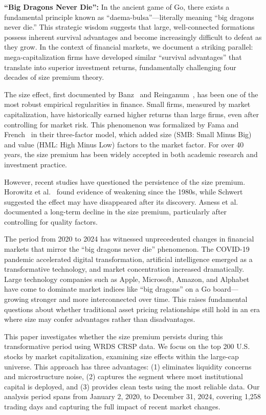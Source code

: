 \documentclass[10pt,letterpaper]{article}
\begin{document}
\textbf{``Big Dragons Never Die'':} In the ancient game of Go, there exists a fundamental principle known as ``daema-bulsa''---literally meaning ``big dragons never die.'' This strategic wisdom suggests that large, well-connected formations possess inherent survival advantages and become increasingly difficult to defeat as they grow. In the context of financial markets, we document a striking parallel: mega-capitalization firms have developed similar ``survival advantages'' that translate into superior investment returns, fundamentally challenging four decades of size premium theory.

The size effect, first documented by Banz~\cite{banz1981} and Reinganum~\cite{reinganum1981}, has been one of the most robust empirical regularities in finance. Small firms, measured by market capitalization, have historically earned higher returns than large firms, even after controlling for market risk. This phenomenon was formalized by Fama and French~\cite{fama1993} in their three-factor model, which added size (SMB: Small Minus Big) and value (HML: High Minus Low) factors to the market factor. For over 40 years, the size premium has been widely accepted in both academic research and investment practice.

However, recent studies have questioned the persistence of the size premium. Horowitz et al.~\cite{horowitz2000} found evidence of weakening since the 1980s, while Schwert~\cite{schwert2003} suggested the effect may have disappeared after its discovery. Asness et al.~\cite{asness2018} documented a long-term decline in the size premium, particularly after controlling for quality factors.

The period from 2020 to 2024 has witnessed unprecedented changes in financial markets that mirror the ``big dragons never die'' phenomenon. The COVID-19 pandemic accelerated digital transformation, artificial intelligence emerged as a transformative technology, and market concentration increased dramatically. Large technology companies such as Apple, Microsoft, Amazon, and Alphabet have come to dominate market indices like ``big dragons'' on a Go board---growing stronger and more interconnected over time. This raises fundamental questions about whether traditional asset pricing relationships still hold in an era where size may confer advantages rather than disadvantages.

This paper investigates whether the size premium persists during this transformative period using WRDS CRSP data. We focus on the top 200 U.S. stocks by market capitalization, examining size effects within the large-cap universe. This approach has three advantages: (1) eliminates liquidity concerns and microstructure noise, (2) captures the segment where most institutional capital is deployed, and (3) provides clean tests using the most reliable data. Our analysis period spans from January 2, 2020, to December 31, 2024, covering 1,258 trading days and capturing the full impact of recent market changes.
\end{document}
